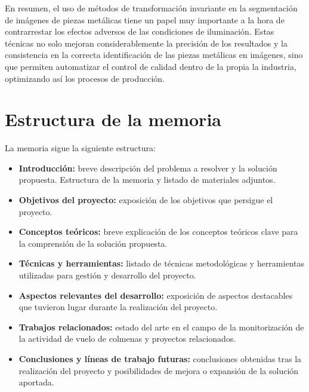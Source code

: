 En resumen, el uso de métodos de transformación invariante en la segmentación de imágenes de piezas metálicas tiene un papel muy importante a la hora de contrarrestar los efectos adversos de las condiciones de iluminación. Estas técnicas no solo mejoran considerablemente la precisión de los resultados y la consistencia en la correcta identificación de las piezas metálicas en imágenes, sino que permiten automatizar el control de calidad dentro de la propia la industria, optimizando así los procesos de producción.


%
%

\section{Estructura de la memoria}\label{estructura-de-la-memoria}

La memoria sigue la siguiente estructura:

\begin{itemize}
    \tightlist
        \item
            \textbf{Introducción:} breve descripción del problema a resolver y la solución propuesta. Estructura de la memoria y listado de materiales adjuntos.
        \item
            \textbf{Objetivos del proyecto:} exposición de los objetivos que persigue el proyecto.
        \item
            \textbf{Conceptos teóricos:} breve explicación de los conceptos teóricos clave para la comprensión de la solución propuesta.
        \item
            \textbf{Técnicas y herramientas:} listado de técnicas metodológicas y herramientas utilizadas para gestión y desarrollo del proyecto.
        \item
            \textbf{Aspectos relevantes del desarrollo:} exposición de aspectos destacables que tuvieron lugar durante la realización del proyecto.
        \item
            \textbf{Trabajos relacionados:} estado del arte en el campo de la monitorización de la actividad de vuelo de colmenas y proyectos relacionados.
        \item
            \textbf{Conclusiones y líneas de trabajo futuras:} conclusiones obtenidas tras la realización del proyecto y posibilidades de mejora o expansión de la solución aportada.
\end{itemize}


